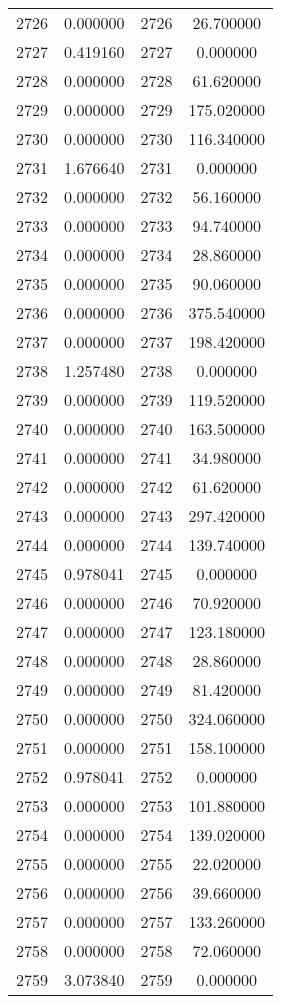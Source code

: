 \documentclass[12pt]{article}
\begin{document}
\begin{longtable}{@{}cccc@{}}
2726 & 0.000000 & 2726 & 26.700000 \\
2727 & 0.419160 & 2727 & 0.000000 \\
2728 & 0.000000 & 2728 & 61.620000 \\
2729 & 0.000000 & 2729 & 175.020000 \\
2730 & 0.000000 & 2730 & 116.340000 \\
2731 & 1.676640 & 2731 & 0.000000 \\
2732 & 0.000000 & 2732 & 56.160000 \\
2733 & 0.000000 & 2733 & 94.740000 \\
2734 & 0.000000 & 2734 & 28.860000 \\
2735 & 0.000000 & 2735 & 90.060000 \\
2736 & 0.000000 & 2736 & 375.540000 \\
2737 & 0.000000 & 2737 & 198.420000 \\
2738 & 1.257480 & 2738 & 0.000000 \\
2739 & 0.000000 & 2739 & 119.520000 \\
2740 & 0.000000 & 2740 & 163.500000 \\
2741 & 0.000000 & 2741 & 34.980000 \\
2742 & 0.000000 & 2742 & 61.620000 \\
2743 & 0.000000 & 2743 & 297.420000 \\
2744 & 0.000000 & 2744 & 139.740000 \\
2745 & 0.978041 & 2745 & 0.000000 \\
2746 & 0.000000 & 2746 & 70.920000 \\
2747 & 0.000000 & 2747 & 123.180000 \\
2748 & 0.000000 & 2748 & 28.860000 \\
2749 & 0.000000 & 2749 & 81.420000 \\
2750 & 0.000000 & 2750 & 324.060000 \\
2751 & 0.000000 & 2751 & 158.100000 \\
2752 & 0.978041 & 2752 & 0.000000 \\
2753 & 0.000000 & 2753 & 101.880000 \\
2754 & 0.000000 & 2754 & 139.020000 \\
2755 & 0.000000 & 2755 & 22.020000 \\
2756 & 0.000000 & 2756 & 39.660000 \\
2757 & 0.000000 & 2757 & 133.260000 \\
2758 & 0.000000 & 2758 & 72.060000 \\
2759 & 3.073840 & 2759 & 0.000000 \\

\end{longtable}
\end{document}
